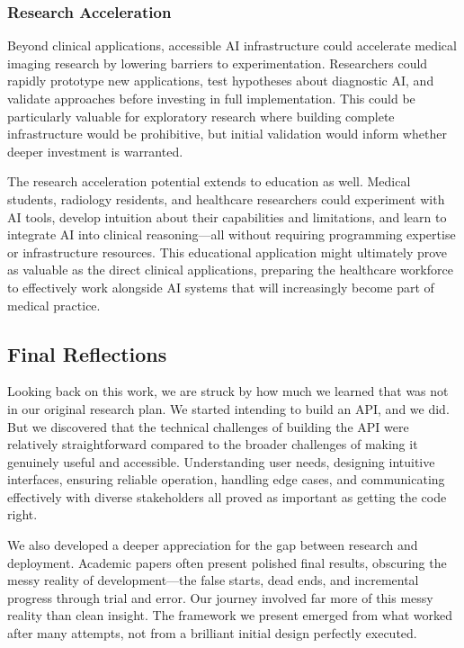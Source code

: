 \documentclass[12pt,a4paper]{article}
\begin{document}
\subsubsection{Research Acceleration}

Beyond clinical applications, accessible AI infrastructure could accelerate medical imaging research by lowering barriers to experimentation. Researchers could rapidly prototype new applications, test hypotheses about diagnostic AI, and validate approaches before investing in full implementation. This could be particularly valuable for exploratory research where building complete infrastructure would be prohibitive, but initial validation would inform whether deeper investment is warranted.

The research acceleration potential extends to education as well. Medical students, radiology residents, and healthcare researchers could experiment with AI tools, develop intuition about their capabilities and limitations, and learn to integrate AI into clinical reasoning—all without requiring programming expertise or infrastructure resources. This educational application might ultimately prove as valuable as the direct clinical applications, preparing the healthcare workforce to effectively work alongside AI systems that will increasingly become part of medical practice.

\subsection{Final Reflections}

Looking back on this work, we are struck by how much we learned that was not in our original research plan. We started intending to build an API, and we did. But we discovered that the technical challenges of building the API were relatively straightforward compared to the broader challenges of making it genuinely useful and accessible. Understanding user needs, designing intuitive interfaces, ensuring reliable operation, handling edge cases, and communicating effectively with diverse stakeholders all proved as important as getting the code right.

We also developed a deeper appreciation for the gap between research and deployment. Academic papers often present polished final results, obscuring the messy reality of development—the false starts, dead ends, and incremental progress through trial and error. Our journey involved far more of this messy reality than clean insight. The framework we present emerged from what worked after many attempts, not from a brilliant initial design perfectly executed.
\end{document}
